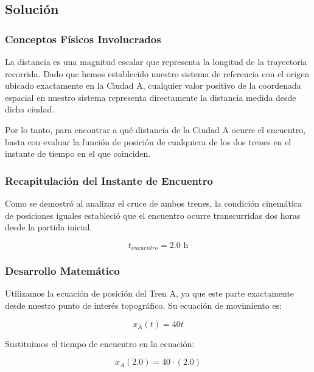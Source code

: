 \documentclass[12pt, a4paper]{article}
\begin{document}
\subsection*{Solución}

\subsubsection*{Conceptos Físicos Involucrados}

La distancia es una magnitud escalar que representa la longitud de la trayectoria recorrida. Dado que hemos establecido nuestro sistema de referencia con el origen ubicado exactamente en la Ciudad A, cualquier valor positivo de la coordenada espacial en nuestro sistema representa directamente la distancia medida desde dicha ciudad. 

Por lo tanto, para encontrar a qué distancia de la Ciudad A ocurre el encuentro, basta con evaluar la función de posición de cualquiera de los dos trenes en el instante de tiempo en el que coinciden.

\subsubsection*{Recapitulación del Instante de Encuentro}

Como se demostró al analizar el cruce de ambos trenes, la condición cinemática de posiciones iguales estableció que el encuentro ocurre transcurridas dos horas desde la partida inicial. 

\begin{equation}
t_{encuentro} = 2.0 \text{ h}
\end{equation}

\subsubsection*{Desarrollo Matemático}

Utilizamos la ecuación de posición del Tren A, ya que este parte exactamente desde nuestro punto de interés topográfico. Su ecuación de movimiento es:

\begin{equation}
x_A(t) = 40t
\end{equation}

Sustituimos el tiempo de encuentro en la ecuación:

\begin{equation}
x_A(2.0) = 40 \cdot (2.0)
\end{equation}
\end{document}
